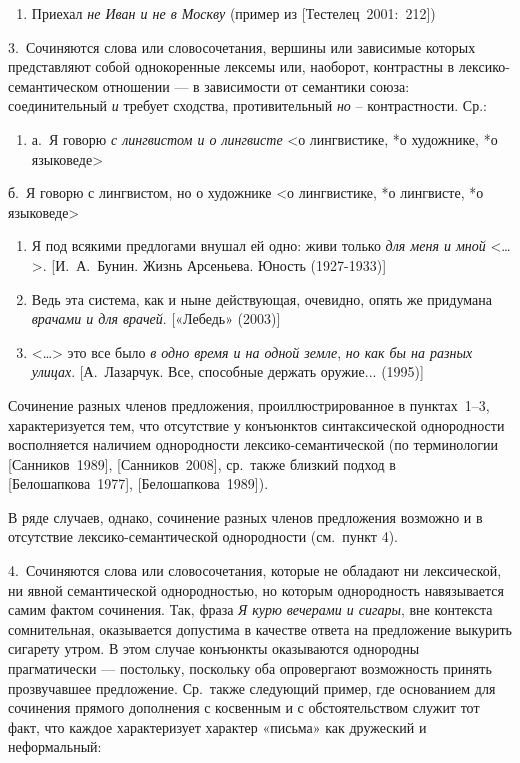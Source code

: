 \begin{enumerate}
\def\labelenumi{(\arabic{enumi})}
\setcounter{enumi}{37}
\item
  Приехал \textit{не Иван и не в Москву} (пример из
  {[}Тестелец~2001:~212{]})
\end{enumerate}

3.~Сочиняются слова или словосочетания, вершины или зависимые которых
представляют собой однокоренные лексемы или, наоборот, контрастны в
лексико-семантическом отношении --- в зависимости от семантики союза:
соединительный \textit{и} требует сходства, противительный \textit{но} --
контрастности. Ср.:

\begin{enumerate}
\def\labelenumi{(\arabic{enumi})}
\setcounter{enumi}{38}
\item
  а.~Я говорю \textit{с лингвистом и о лингвисте} \textless о лингвистике,
  *о художнике, *о языковеде\textgreater{}
\end{enumerate}

б.~Я говорю с лингвистом, но о художнике \textless*о лингвистике, *о
лингвисте, *о языковеде\textgreater{}

\begin{enumerate}
\def\labelenumi{(\arabic{enumi})}
\setcounter{enumi}{39}
\item
  Я под всякими предлогами внушал ей одно: живи только \textit{для меня и
  мной} \textless\ldots\textgreater. {[}И.~А.~Бунин. Жизнь Арсеньева.
  Юность (1927-1933){]}
\item
  Ведь эта система, как и ныне действующая, очевидно, опять же придумана
  \textit{врачами и для врачей}. {[}«Лебедь» (2003){]}
\item
  \textless\ldots\textgreater{} это все было \textit{в одно время и на
  одной земле}, \textit{но как бы на разных улицах}. {[}А.~Лазарчук. Все,
  способные держать оружие... (1995){]}
\end{enumerate}

Сочинение разных членов предложения, проиллюстрированное в пунктах~1--3,
характеризуется тем, что отсутствие у конъюнктов синтаксической
однородности восполняется наличием однородности лексико-семантической
(по терминологии {[}Санников~1989{]}, {[}Санников~2008{]}, ср.~также
близкий подход в {[}Белошапкова~1977{]}, {[}Белошапкова~1989{]}).

В ряде случаев, однако, сочинение разных членов предложения возможно и в
отсутствие лексико-семантической однородности (см.~пункт 4).

4.~Сочиняются слова или словосочетания, которые не обладают ни
лексической, ни явной семантической однородностью, но которым
однородность навязывается самим фактом сочинения. Так, фраза \textit{Я
курю вечерами и сигары}, вне контекста сомнительная, оказывается
допустима в качестве ответа на предложение выкурить сигарету утром. В
этом случае конъюнкты оказываются однородны прагматически --- постольку,
поскольку оба опровергают возможность принять прозвучавшее предложение.
Ср.~также следующий пример, где основанием для сочинения прямого
дополнения с косвенным и с обстоятельством служит тот факт, что каждое
характеризует характер «письма» как дружеский и неформальный:


